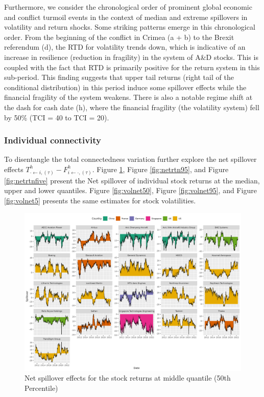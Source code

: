\documentclass[
  letterpaper,
  DIV=11,
  numbers=noendperiod]{scrartcl}
\begin{document}
Furthermore, we consider the chronological order of prominent global
economic and conflict turmoil events in the context of median and
extreme spillovers in volatility and return shocks. Some striking
patterns emerge in this chronological order. From the beginning of the
conflict in Crimea (a + b) to the Brexit referendum (d), the RTD for
volatility trends down, which is indicative of an increase in resilience
(reduction in fragility) in the system of A\&D stocks. This is coupled
with the fact that RTD is primarily positive for the return system in
this sub-period. This finding suggests that upper tail returns (right
tail of the conditional distribution) in this period induce some
spillover effects while the financial fragility of the system weakens.
There is also a notable regime shift at the dash for cash date (h),
where the financial fragility (the volatility system) fell by 50\% (TCI
= 40 to TCI = 20).

\hypertarget{individual-connectivity}{%
\subsubsection{Individual connectivity}\label{individual-connectivity}}

To disentangle the total connectedness variation further explore the net
spillover effects
\(T_{\cdot \leftarrow i,(\tau)}^h -F_{i \leftarrow \cdot,(\tau)}^h\).
Figure \ref{fig:netrtn50}, Figure \ref{fig:netrtn95}, and Figure
\ref{fig:netrtnfive} present the Net spillover of individual stock
returns at the median, upper and lower quantiles. Figure
\ref{fig:volnet50}, Figure \ref{fig:volnet95}, and Figure
\ref{fig:volnet5} presents the same estimates for stock volatilities.

\begin{figure}
\centering
  \includegraphics{plots/fig-rtnnet50.png}
  \caption{Net spillover effects for the stock returns at middle quantile (50th Percentile)}
  \label{fig:netrtn50}
\end{figure}
\end{document}
